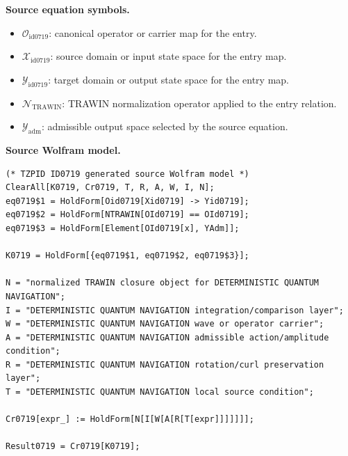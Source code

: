 \begin{minipage}[t]{0.49\linewidth}
\begingroup
\small
\raggedright
\textbf{Source equation symbols.}\par
\begin{itemize}[leftmargin=1.35em,itemsep=1pt,topsep=1pt,parsep=0pt]
    \item $\mathcal{O}_{\mathrm{id0719}}$: canonical operator or carrier map for the entry.
    \item $\mathcal{X}_{\mathrm{id0719}}$: source domain or input state space for the entry map.
    \item $\mathcal{Y}_{\mathrm{id0719}}$: target domain or output state space for the entry map.
    \item $\mathcal{N}_{\mathrm{TRAWIN}}$: TRAWIN normalization operator applied to the entry relation.
    \item $\mathcal{Y}_{\mathrm{adm}}$: admissible output space selected by the source equation.
\end{itemize}
\endgroup
\end{minipage}\hfill
\begin{minipage}[t]{0.47\linewidth}
\begingroup
\scriptsize
\raggedright
\textbf{Source Wolfram model.}\par
\begin{Verbatim}[fontsize=\tiny,breaklines=true,breakanywhere=true]
(* TZPID ID0719 generated source Wolfram model *)
ClearAll[K0719, Cr0719, T, R, A, W, I, N];
eq0719$1 = HoldForm[Oid0719[Xid0719] -> Yid0719];
eq0719$2 = HoldForm[NTRAWIN[OId0719] == OId0719];
eq0719$3 = HoldForm[Element[OId0719[x], YAdm]];

K0719 = HoldForm[{eq0719$1, eq0719$2, eq0719$3}];

N = "normalized TRAWIN closure object for DETERMINISTIC QUANTUM NAVIGATION";
I = "DETERMINISTIC QUANTUM NAVIGATION integration/comparison layer";
W = "DETERMINISTIC QUANTUM NAVIGATION wave or operator carrier";
A = "DETERMINISTIC QUANTUM NAVIGATION admissible action/amplitude condition";
R = "DETERMINISTIC QUANTUM NAVIGATION rotation/curl preservation layer";
T = "DETERMINISTIC QUANTUM NAVIGATION local source condition";

Cr0719[expr_] := HoldForm[N[I[W[A[R[T[expr]]]]]]];

Result0719 = Cr0719[K0719];
\end{Verbatim}
\endgroup
\end{minipage}

